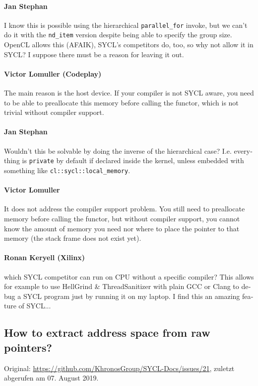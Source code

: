 \begin{otherlanguage}{english}
    \paragraph{Jan Stephan} I know this is possible using the hierarchical
                            \texttt{parallel\_for} invoke, but we can't do it
                            with the \texttt{nd\_item} version despite being
                            able to specify the group size. OpenCL allows this
                            (AFAIK), SYCL's competitors do, too, so why not
                            allow it in SYCL? I suppose there must be a reason
                            for leaving it out.
    \paragraph{Victor Lomuller (Codeplay)} The main reason is the host device.
                            If your compiler is not SYCL aware, you need to be
                            able to preallocate this memory before calling the
                            functor, which is not trivial without compiler
                            support.
    \paragraph{Jan Stephan} Wouldn't this be solvable by doing the inverse of
                            the hierarchical case? I.e. everything is
                            \texttt{private} by default if declared inside the
                            kernel, unless embedded with something like
                            \texttt{cl::sycl::local\_memory}.
    \paragraph{Victor Lomuller} It does not address the compiler support
                                problem. You still need to preallocate memory
                                before calling the functor, but without compiler
                                support, you cannot know the amount of memory
                                you need nor where to place the pointer to that
                                memory (the stack frame does not exist yet).
    \paragraph{Ronan Keryell (Xilinx)} which SYCL competitor can run on CPU
                              without a specific compiler? This allows for
                              example to use HellGrind \& ThreadSanitizer with
                              plain GCC or Clang to debug a SYCL program just by
                              running it on my laptop. I find this an amazing
                              feature of SYCL...
\end{otherlanguage}

\subsection{How to extract address space from raw pointers?}

Original: \url{https://github.com/KhronosGroup/SYCL-Docs/issues/21}, zuletzt
abgerufen am 07. August 2019.
